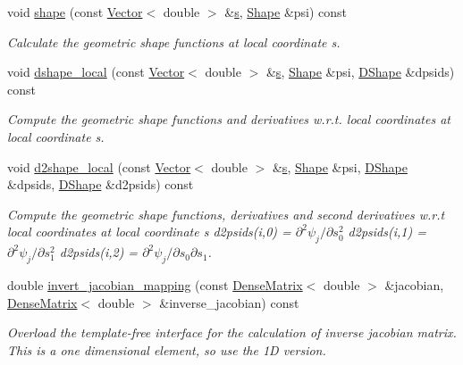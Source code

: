 \begin{DoxyCompactItemize}
void \hyperlink{classoomph_1_1TElement_3_011_00_01NNODE__1D_01_4_ab9ba6ae1a07589f1b41adc06f2e17884}{shape} (const \hyperlink{classoomph_1_1Vector}{Vector}$<$ double $>$ \&\hyperlink{cfortran_8h_ab7123126e4885ef647dd9c6e3807a21c}{s}, \hyperlink{classoomph_1_1Shape}{Shape} \&psi) const
\begin{DoxyCompactList}\small\item\em Calculate the geometric shape functions at local coordinate s. \end{DoxyCompactList}\item 
void \hyperlink{classoomph_1_1TElement_3_011_00_01NNODE__1D_01_4_a1e49eedf8868cbc51ccb1a6a1b7f7144}{dshape\+\_\+local} (const \hyperlink{classoomph_1_1Vector}{Vector}$<$ double $>$ \&\hyperlink{cfortran_8h_ab7123126e4885ef647dd9c6e3807a21c}{s}, \hyperlink{classoomph_1_1Shape}{Shape} \&psi, \hyperlink{classoomph_1_1DShape}{D\+Shape} \&dpsids) const
\begin{DoxyCompactList}\small\item\em Compute the geometric shape functions and derivatives w.\+r.\+t. local coordinates at local coordinate s. \end{DoxyCompactList}\item 
void \hyperlink{classoomph_1_1TElement_3_011_00_01NNODE__1D_01_4_a3ae243b769f8aad1ba4bbf01c1a3d2d9}{d2shape\+\_\+local} (const \hyperlink{classoomph_1_1Vector}{Vector}$<$ double $>$ \&\hyperlink{cfortran_8h_ab7123126e4885ef647dd9c6e3807a21c}{s}, \hyperlink{classoomph_1_1Shape}{Shape} \&psi, \hyperlink{classoomph_1_1DShape}{D\+Shape} \&dpsids, \hyperlink{classoomph_1_1DShape}{D\+Shape} \&d2psids) const
\begin{DoxyCompactList}\small\item\em Compute the geometric shape functions, derivatives and second derivatives w.\+r.\+t local coordinates at local coordinate s d2psids(i,0) = $ \partial^2 \psi_j / \partial s_0^2 $ d2psids(i,1) = $ \partial^2 \psi_j / \partial s_1^2 $ d2psids(i,2) = $ \partial^2 \psi_j / \partial s_0 \partial s_1 $. \end{DoxyCompactList}\item 
double \hyperlink{classoomph_1_1TElement_3_011_00_01NNODE__1D_01_4_a9b258cbb903c83eb12054edd6cc3fa92}{invert\+\_\+jacobian\+\_\+mapping} (const \hyperlink{classoomph_1_1DenseMatrix}{Dense\+Matrix}$<$ double $>$ \&jacobian, \hyperlink{classoomph_1_1DenseMatrix}{Dense\+Matrix}$<$ double $>$ \&inverse\+\_\+jacobian) const
\begin{DoxyCompactList}\small\item\em Overload the template-\/free interface for the calculation of inverse jacobian matrix. This is a one dimensional element, so use the 1D version. \end{DoxyCompactList}\item 

\end{DoxyCompactItemize}
